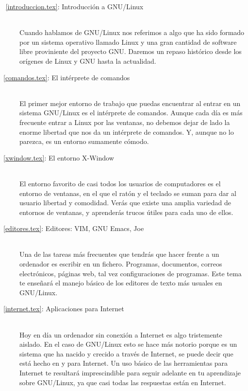 \begin{description}

\item[\chaptername~ \ref{introduccion.tex}:  Introducción a GNU/Linux]
~\\ Cuando  hablamos de  GNU/Linux nos  referimos a  algo que  ha sido
formado por un sistema operativo llamado  Linux y una gran cantidad de
software  libre  proviniente  del  proyecto  GNU.  Daremos  un  repaso
histórico desde los orígenes de Linux y GNU hasta la actualidad.

\item[\chaptername~\ref{comandos.tex}: El intérprete  de comandos] ~\\
El primer mejor entorno de trabajo  que puedas encuentrar al entrar en
un sistema GNU/Linux es el intérprete  de comandos. Aunque cada día es
más frecuente  entrar a Linux  por las  ventanas, no debemos  dejar de
lado  la enorme  libertad que  nos da  un intérprete  de comandos.  Y,
aunque no lo parezca, es un entorno sumamente cómodo.

\item[\chaptername~\ref{xwindow.tex}:  El  entorno  X-Window]  ~\\  El
entorno  favorito de  casi todos  los usuarios  de computadores  es el
entorno de ventanas, en el que el ratón y el teclado se suman para dar
al usuario libertad y comodidad.  Verás que existe una amplia variedad
de entornos de  ventanas, y aprenderás trucos útiles para  cada uno de
ellos.

\item[\chaptername~\ref{editores.tex}: Editores: VIM,  GNU Emacs, Joe]
~\\ Una de las tareas más frecuentes que tendrás que hacer frente a un
ordenador es  escribir en  un fichero. Programas,  documentos, correos
electrónicos, páginas web, tal  vez configuraciones de programas. Este
tema te enseñará el manejo básico de los editores de texto más usuales
en GNU/Linux.


\item[\chaptername~\ref{internet.tex}: Aplicaciones para Internet] ~\\
Hoy en  día un ordenador sin  conexión a Internet es  algo tristemente
aislado. En el caso de GNU/Linux esto se hace más notorio porque es un
sistema que ha  nacido y crecido a través de  Internet, se puede decir
que está hecho  en y para Internet. Un uso  básico de las herramientas
para Internet te  resultará imprescindible para seguir  adelante en tu
aprendizaje sobre GNU/Linux, ya que casi todas las respuestas están en
Internet.


\end{description}
